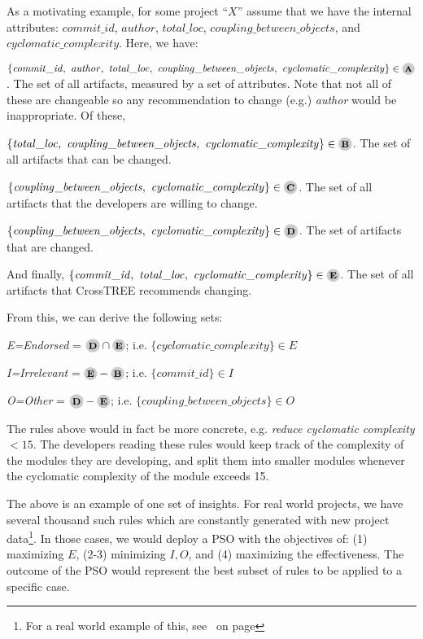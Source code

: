 As a motivating example, for some project ``$X$'' assume that we have the internal attributes: $commit\_id$, $author$, $total\_loc$, $coupling\_between\_objects$, and $cyclomatic\_complexity$. Here, we have:
\bi
\item $\{\mathit{commit\_id,~author,~total\_loc,~coupling\_between\_objects,~cyclomatic\_complexity}\}\in \circled{A}$. The set of all artifacts, measured by a set
of attributes. Note that not all of these are changeable  so any recommendation to change (e.g.) {\em author} would be inappropriate.
Of these, 
\item $\{\mathit{total\_loc,~coupling\_between\_objects,~cyclomatic\_complexity}\}\in \circled{B}$. The set of all artifacts that can be changed.
\item $\{\mathit{coupling\_between\_objects,~cyclomatic\_complexity}\}\in \circled{C}$. The set of all artifacts that the developers are willing to change.
\item $\{\mathit{coupling\_between\_objects,~cyclomatic\_complexity}\}\in \circled{D}$. The set of artifacts that are changed.
\item And finally, $\{\mathit{commit\_id,~total\_loc,~cyclomatic\_complexity}\}\in \circled{E}$. The set of all artifacts that CrossTREE recommends changing.
\ei

\noindent From this, we can derive the following sets:
\bi
\item  {\em E=Endorsed} = $\circled{D} \cap \circled{E}$; i.e. $\{cyclomatic\_complexity\}\in E$
\item {\em I=Irrelevant} =  $\circled{E} - \circled{B}$; i.e.  $\{commit\_id\}\in I$
\item {\em O=Other} = $\circled{D}- \circled{E}$; i.e. $\{coupling\_between\_objects\}\in O$
\ei

\noindent The rules above would in fact be more concrete, e.g. {\em reduce cyclomatic complexity $<15$}. The developers reading these rules 
would keep track of the complexity of the modules they are developing, and split them into smaller modules whenever the cyclomatic complexity of the module exceeds 15. 

The above is an example of one set of insights. For real world projects, we have several thousand such rules which are constantly generated with new project data\footnote{For a real world example of this, see~ on page \pageref{fig:bluemix}}. In those cases, we would deploy a PSO with the objectives of: (1) maximizing $E$, (2-3) minimizing $I, O$, and (4) maximizing the effectiveness. The outcome of the PSO would represent the best subset of rules to be applied to a specific case.

